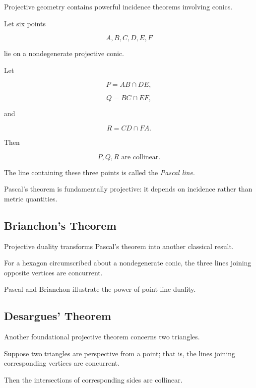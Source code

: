 Projective geometry contains powerful incidence theorems involving conics.

\begin{theorem}
Let six points

\[
A,B,C,D,E,F
\]

lie on a nondegenerate projective conic.

Let

\[
P=AB\cap DE,
\]

\[
Q=BC\cap EF,
\]

and

\[
R=CD\cap FA.
\]

Then

\[
\boxed{P,Q,R\text{ are collinear}.}
\]
\end{theorem}

The line containing these three points is called the \emph{Pascal line}.

Pascal's theorem is fundamentally projective: it depends on incidence rather
than metric quantities.

\subsection{Brianchon's Theorem}
\label{subsec:brianchons-theorem}

Projective duality transforms Pascal's theorem into another classical result.

\begin{theorem}
For a hexagon circumscribed about a nondegenerate conic, the three lines
joining opposite vertices are concurrent.
\end{theorem}

Pascal and Brianchon illustrate the power of point-line duality.

\subsection{Desargues' Theorem}
\label{subsec:desargues-theorem}

Another foundational projective theorem concerns two triangles.

\begin{theorem}
Suppose two triangles are perspective from a point; that is, the lines
joining corresponding vertices are concurrent.

Then the intersections of corresponding sides are collinear.
\end{theorem}

